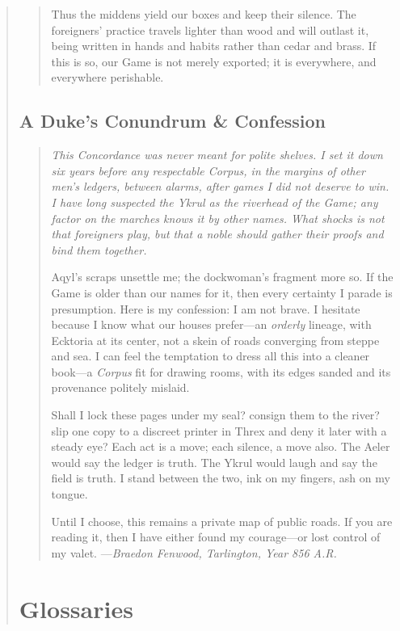 \documentclass[11pt]{article}
\begin{document}
\begin{quote}
\begin{quote}
\medskip
\noindent Thus the middens yield our boxes and keep their silence. The foreigners’ practice travels lighter than wood and will outlast it, being written in hands and habits rather than cedar and brass. If this is so, our Game is not merely exported; it is everywhere, and everywhere perishable.
\end{quote}

\subsection*{A Duke’s Conundrum \& Confession}

\begin{quote}\small\itshape
This \emph{Concordance} was never meant for polite shelves. I set it down six years before any respectable \emph{Corpus}, in the margins of other men’s ledgers, between alarms, after games I did not deserve to win. I have long suspected the Ykrul as the riverhead of the Game; any factor on the marches knows it by other names. What shocks is not that foreigners play, but that a noble should gather their proofs and bind them together.

Aqyl’s scraps unsettle me; the dockwoman’s fragment more so. If the Game is older than our names for it, then every certainty I parade is presumption. Here is my confession: I am not brave. I hesitate because I know what our houses prefer—an \emph{orderly} lineage, with Ecktoria at its center, not a skein of roads converging from steppe and sea. I can feel the temptation to dress all this into a cleaner book—a \emph{Corpus} fit for drawing rooms, with its edges sanded and its provenance politely mislaid.

Shall I lock these pages under my seal? consign them to the river? slip one copy to a discreet printer in Threx and deny it later with a steady eye? Each act is a move; each silence, a move also. The Aeler would say the ledger is truth. The Ykrul would laugh and say the field is truth. I stand between the two, ink on my fingers, ash on my tongue.

Until I choose, this remains a private map of public roads. If you are reading it, then I have either found my courage—or lost control of my valet.
\hfill---\textit{Braedon Fenwood, Tarlington, Year 856 A.R.}
\end{quote}


\section{Glossaries}

\end{quote}
\end{document}
